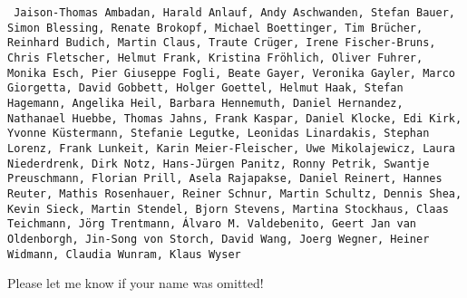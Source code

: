 \texttt{
Jaison-Thomas Ambadan,
Harald Anlauf,
Andy Aschwanden,
Stefan Bauer,
Simon Blessing,
Renate Brokopf,
Michael Boettinger,
Tim Br\"ucher,
Reinhard Budich,
Martin Claus,
Traute Cr\"uger,
Irene Fischer-Bruns,
Chris Fletscher,
Helmut Frank,
Kristina Fr\"ohlich,
Oliver Fuhrer,
Monika Esch,
Pier Giuseppe Fogli,
Beate Gayer,
Veronika Gayler,
Marco Giorgetta,
David Gobbett,
Holger Goettel,
Helmut Haak,
Stefan Hagemann,
Angelika Heil,
Barbara Hennemuth,
Daniel Hernandez,
Nathanael Huebbe,
Thomas Jahns,
Frank Kaspar,
Daniel Klocke,
Edi Kirk,
Yvonne K\"ustermann,
Stefanie Legutke,
Leonidas Linardakis,
Stephan Lorenz,
Frank Lunkeit,
Karin Meier-Fleischer,
Uwe Mikolajewicz,
Laura Niederdrenk,
Dirk Notz,
Hans-J\"urgen Panitz,
Ronny Petrik,
Swantje Preuschmann,
Florian Prill,
Asela Rajapakse,
Daniel Reinert,
Hannes Reuter,
Mathis Rosenhauer,
Reiner Schnur,
Martin Schultz,
Dennis Shea,
Kevin Sieck,
Martin Stendel,
Bjorn Stevens,
Martina Stockhaus,
Claas Teichmann,
J\"org Trentmann,
\'Alvaro M. Valdebenito,
Geert Jan van Oldenborgh,
Jin-Song von Storch,
David Wang,
Joerg Wegner,
Heiner Widmann,
Claudia Wunram,
Klaus Wyser
}

Please let me know if your name was omitted!
